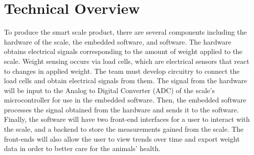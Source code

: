 
\chapter{Technical Overview}

To produce the smart scale product, there are several components including the hardware of the scale, the embedded software, and software. The hardware obtains electrical signals corresponding to the amount of weight applied to the scale. Weight sensing occurs via load cells, which are electrical sensors that react to changes in applied weight. The team must develop circuitry to connect the load cells and obtain electrical signals from them. The signal from the hardware will be input to the Analog to Digital Converter (ADC) of the scale’s microcontroller for use in the embedded software. Then, the embedded software processes the signal obtained from the hardware and sends it to the software. Finally, the software will have two front-end interfaces for a user to interact with the scale, and a backend to store the measurements gained from the scale. The front-ends will also allow the user to view trends over time and export weight data in order to better care for the animals’ health.
